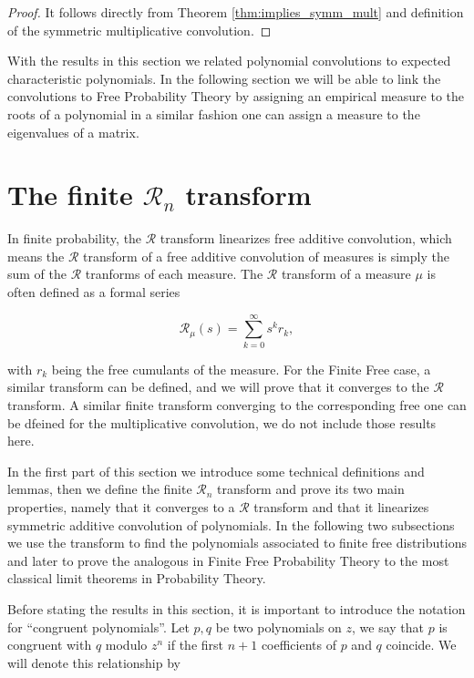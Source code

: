 \begin{proof}
    It follows directly from Theorem \ref{thm:implies_symm_mult} and definition of the symmetric multiplicative convolution.
\end{proof}

With the results in this section we related polynomial convolutions to expected characteristic polynomials. In the following section we will be able to link the convolutions to Free Probability Theory by assigning an empirical measure to the roots of a polynomial in a similar fashion one can assign a measure to the eigenvalues of a matrix.


\section{The finite \texorpdfstring{$\mathcal R_n$}{R_n} transform} 

In finite probability, the $\mathcal R$ transform linearizes free additive convolution, which means the $\mathcal R$ transform of a free additive convolution of measures is simply the sum of the $\mathcal R$ tranforms of each measure. The $\mathcal R$ transform of a measure $\mu$ is often defined as a formal series

\begin{equation*}
    \mathcal R_\mu(s) = \sum_{k=0}^\infty s^{k} r_k,
\end{equation*}

\noindent with $r_k$ being the free cumulants of the measure. For the Finite Free case, a similar transform can be defined, and we will prove that it converges to the $\mathcal R$ transform. A similar finite transform converging to the corresponding free one can be dfeined for the multiplicative convolution, we do not include those results here. 

In the first part of this section we introduce some technical definitions and lemmas, then we define the finite $\mathcal R_n$ transform and prove its two main properties, namely that it converges to a $\mathcal R$ transform and that it linearizes symmetric additive convolution of polynomials. In the following two subsections we use the transform to find the polynomials associated to finite free distributions and later to prove the analogous in Finite Free Probability Theory to the most classical limit theorems in Probability Theory.

Before stating the results in this section, it is important to introduce the notation for ``congruent polynomials''. Let $p,q$ be two polynomials on $z$, we say that $p$ is congruent with $q$ modulo $z^{n}$ if the first $n+1$ coefficients of $p$ and $q$ coincide. We will denote this relationship by

